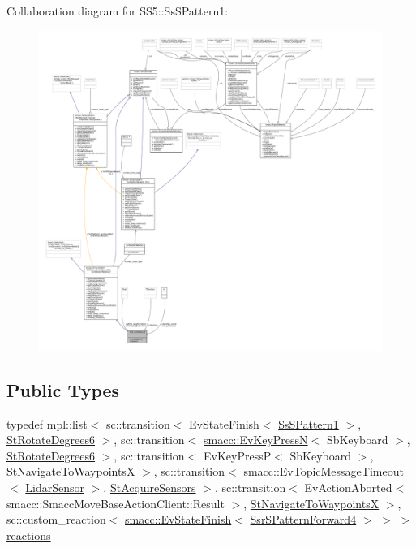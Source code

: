 Collaboration diagram for S\+S5\+:\+:Ss\+S\+Pattern1\+:
\nopagebreak
\begin{figure}[H]
\begin{center}
\leavevmode
\includegraphics[width=350pt]{structSS5_1_1SsSPattern1__coll__graph}
\end{center}
\end{figure}
\subsection*{Public Types}
\begin{DoxyCompactItemize}
\item 
typedef mpl\+::list$<$ sc\+::transition$<$ Ev\+State\+Finish$<$ \hyperlink{structSS5_1_1SsSPattern1}{Ss\+S\+Pattern1} $>$, \hyperlink{structStRotateDegrees6}{St\+Rotate\+Degrees6} $>$, sc\+::transition$<$ \hyperlink{structsmacc_1_1EvKeyPressN}{smacc\+::\+Ev\+Key\+PressN}$<$ Sb\+Keyboard $>$, \hyperlink{structStRotateDegrees6}{St\+Rotate\+Degrees6} $>$, sc\+::transition$<$ Ev\+Key\+PressP$<$ Sb\+Keyboard $>$, \hyperlink{structStNavigateToWaypointsX}{St\+Navigate\+To\+WaypointsX} $>$, sc\+::transition$<$ \hyperlink{structsmacc_1_1EvTopicMessageTimeout}{smacc\+::\+Ev\+Topic\+Message\+Timeout}$<$ \hyperlink{sensor__state_8h_a9db9e1944f88de79507758d08e4a2ee3}{Lidar\+Sensor} $>$, \hyperlink{structStAcquireSensors}{St\+Acquire\+Sensors} $>$, sc\+::transition$<$ Ev\+Action\+Aborted$<$ smacc\+::\+Smacc\+Move\+Base\+Action\+Client\+::\+Result $>$, \hyperlink{structStNavigateToWaypointsX}{St\+Navigate\+To\+WaypointsX} $>$, sc\+::custom\+\_\+reaction$<$ \hyperlink{structsmacc_1_1EvStateFinish}{smacc\+::\+Ev\+State\+Finish}$<$ \hyperlink{structSsrSPatternForward4}{Ssr\+S\+Pattern\+Forward4} $>$ $>$ $>$ \hyperlink{structSS5_1_1SsSPattern1_a88cfe162aa3d8cc21c27ac8982774d5c}{reactions}
\end{DoxyCompactItemize}
